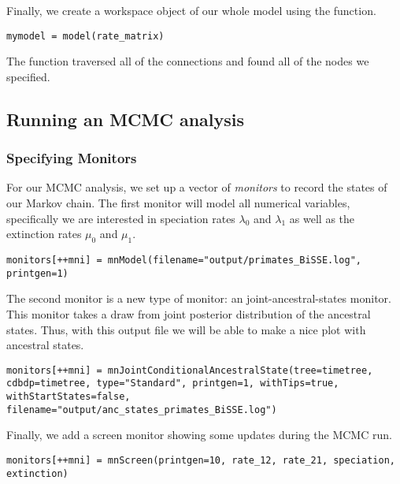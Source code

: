 Finally, we create a workspace object of our whole model using the  function. 
{\tt \begin{snugshade*}
\begin{lstlisting}
mymodel = model(rate_matrix)
\end{lstlisting}
\end{snugshade*}}

The  function traversed all of the connections and found all of the nodes we specified. 


\subsection{Running an MCMC analysis}

\subsubsection{Specifying Monitors}

For our MCMC analysis, we set up a vector of \emph{monitors} to record the states of our Markov chain. 
The first monitor will model all numerical variables, specifically we are interested in speciation rates $\lambda_0$ and $\lambda_1$ as well as the extinction rates $\mu_0$ and $\mu_1$.
{\tt \begin{snugshade*}
\begin{lstlisting}
monitors[++mni] = mnModel(filename="output/primates_BiSSE.log", printgen=1)
\end{lstlisting}
\end{snugshade*}}
The second monitor is a new type of monitor: an joint-ancestral-states monitor.
This monitor takes a draw from joint posterior distribution of the ancestral states.
Thus, with this output file we will be able to make a nice plot with ancestral states.
{\tt \begin{snugshade*}
\begin{lstlisting}
monitors[++mni] = mnJointConditionalAncestralState(tree=timetree, cdbdp=timetree, type="Standard", printgen=1, withTips=true, withStartStates=false, filename="output/anc_states_primates_BiSSE.log")
\end{lstlisting}
\end{snugshade*}}
Finally, we add a screen monitor showing some updates during the MCMC run.
{\tt \begin{snugshade*}
\begin{lstlisting}
monitors[++mni] = mnScreen(printgen=10, rate_12, rate_21, speciation, extinction)
\end{lstlisting}
\end{snugshade*}}

